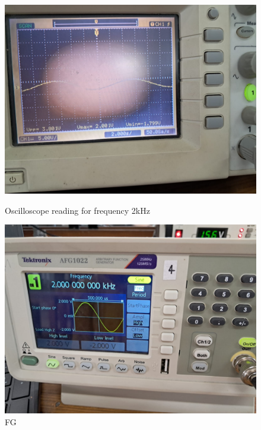 \documentclass[a4paper,12pt]{article}
\begin{document}
\begin{figure}[H]
    \centering
    \begin{minipage}[b]{0.45\textwidth}
        \centering
        \includegraphics[width=\textwidth]{fig/bp/2ko.jpeg}
        \caption{Oscilloscope reading for frequency 2kHz}
    \end{minipage}
    \hfill
    \begin{minipage}[b]{0.45\textwidth}
        \centering
        \includegraphics[width=\textwidth]{fig/bp/2k.jpeg}
        \caption{FG}
    \end{minipage}
\end{figure}
\end{document}
